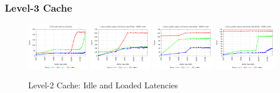 \documentclass{article}
\begin{document}
\subsubsection{Level-3 Cache}
\begin{figure}[!ht]
    \centering
    \includegraphics[width=0.24\textwidth]{../data/mlc/il_l3}
    \includegraphics[width=0.24\textwidth]{../data/mlc/ll_l3_00000}
    \includegraphics[width=0.24\textwidth]{../data/mlc/ll_l3_01000}
    \includegraphics[width=0.24\textwidth]{../data/mlc/ll_l3_10000}
    \caption{Level-2 Cache: Idle and Loaded Latencies}
    \label{figure:mlc_lat_l3}
\end{figure}
\end{document}
